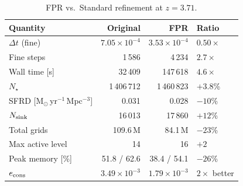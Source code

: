 \documentclass[fleqn,usenatbib]{mnras}
\begin{document}
\begin{table}
\centering
\caption{FPR vs.\ Standard refinement at $z = 3.71$.}
\label{tab:fpr_summary}
\begin{tabular}{lrrl}
\toprule
Quantity & Original & FPR & Ratio \\
\midrule
$\Delta t$ (fine)        & $7.05\times10^{-4}$ & $3.53\times10^{-4}$ & $0.50\times$ \\
Fine steps               & 1\,586 & 4\,234 & $2.7\times$ \\
Wall time [s]            & 32\,409 & 147\,618 & $4.6\times$ \\
$N_\star$                & 1\,406\,712 & 1\,460\,823 & $+3.8$\% \\
SFRD [M$_\odot$\,yr$^{-1}$\,Mpc$^{-3}$] & 0.031 & 0.028 & $-10$\% \\
$N_{\rm sink}$           & 16\,013 & 17\,860 & $+12$\% \\
Total grids              & 109.6\,M & 84.1\,M & $-23$\% \\
Max active level         & 14 & 16 & $+2$ \\
Peak memory [\%]         & 51.8 / 62.6 & 38.4 / 54.1 & $-26$\% \\
$e_{\rm cons}$           & $3.49\times10^{-3}$ & $1.79\times10^{-3}$ & $2\times$ better \\
\bottomrule
\end{tabular}
\end{table}
\end{document}
